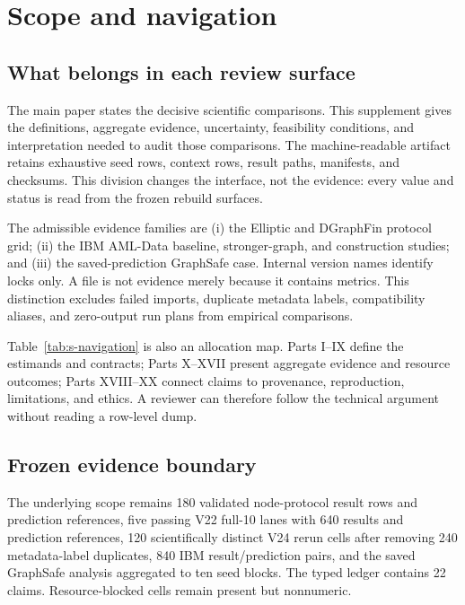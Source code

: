 \section{Scope and navigation}
\label{sec:s-scope-navigation}

\subsection{What belongs in each review surface}

The main paper states the decisive scientific comparisons. This supplement gives the definitions, aggregate evidence, uncertainty, feasibility conditions, and interpretation needed to audit those comparisons. The machine-readable artifact retains exhaustive seed rows, context rows, result paths, manifests, and checksums. This division changes the interface, not the evidence: every value and status is read from the frozen rebuild surfaces.

The admissible evidence families are (i) the Elliptic and DGraphFin protocol grid; (ii) the IBM AML-Data baseline, stronger-graph, and construction studies; and (iii) the saved-prediction GraphSafe case. Internal version names identify locks only. A file is not evidence merely because it contains metrics. This distinction excludes failed imports, duplicate metadata labels, compatibility aliases, and zero-output run plans from empirical comparisons.



Table~\ref{tab:s-navigation} is also an allocation map. Parts I--IX define the estimands and contracts; Parts X--XVII present aggregate evidence and resource outcomes; Parts XVIII--XX connect claims to provenance, reproduction, limitations, and ethics. A reviewer can therefore follow the technical argument without reading a row-level dump.

\subsection{Frozen evidence boundary}

The underlying scope remains 180 validated node-protocol result rows and prediction references, five passing V22 full-10 lanes with 640 results and prediction references, 120 scientifically distinct V24 rerun cells after removing 240 metadata-label duplicates, 840 IBM result/prediction pairs, and the saved GraphSafe analysis aggregated to ten seed blocks. The typed ledger contains 22 claims. Resource-blocked cells remain present but nonnumeric.

